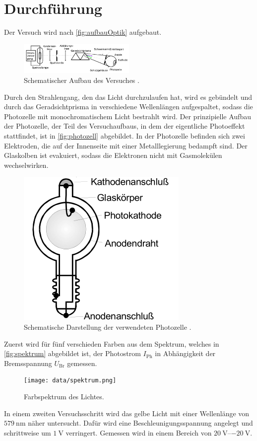 \section{Durchführung}
\label{sec:Durchführung}

Der Versuch wird nach \autoref{fig:aufbauOptik} aufgebaut.
\begin{figure}[H]
    \centering
    \includegraphics[width = 0.5\textwidth]{data/optischerTeil.png}
    \caption{Schematischer Aufbau des Versuches \cite{Anleitung500}.}
    \label{fig:aufbauOptik}
\end{figure}

\noindent
Durch den Strahlengang, den das Licht durchzulaufen hat, wird es gebündelt und durch das Geradsichtprisma in verschiedene Wellenlängen aufgespaltet, sodass
die Photozelle mit monochromatischem Licht bestrahlt wird. Der prinzipielle Aufbau der Photozelle, der Teil des Versuchaufbaus, in dem der eigentliche Photoeffekt
stattfindet, ist in \autoref{fig:photozell} abgebildet. In der Photozelle befinden sich zwei Elektroden, die auf der Innenseite 
mit einer Metalllegierung bedampft sind. Der Glaskolben ist evakuiert, sodass die Elektronen nicht mit Gasmolekülen wechselwirken.
\begin{figure}[H]
    \centering
    \includegraphics{data/photozelle.png}
    \caption{Schematische Darstellung der verwendeten Photozelle \cite{Anleitung500}.}
    \label{fig:photozell}
\end{figure}

\noindent
Zuerst wird für fünf verschieden Farben aus dem Spektrum, welches in \autoref{fig:spektrum} abgebildet ist, der Photostrom $I_{\text{Ph}}$ in Abhängigkeit der
Bremsspannung $U_{\text{Br}}$ gemessen.
\begin{figure}[H]
    \centering
    \texttt{[image: data/spektrum.png]}
    \caption{Farbspektrum des Lichtes.}
    \label{fig:spektrum}
\end{figure}

\noindent
In einem zweiten Versuchsschritt wird das gelbe Licht mit einer Wellenlänge von $\SI{579}{\nano\metre}$ näher untersucht. Dafür wird eine Beschleunigungsspannung
angelegt und schrittweise um $\SI{1}{\volt}$ verringert. Gemessen wird in einem Bereich von $\SIrange{20}{-20}{\volt}$.